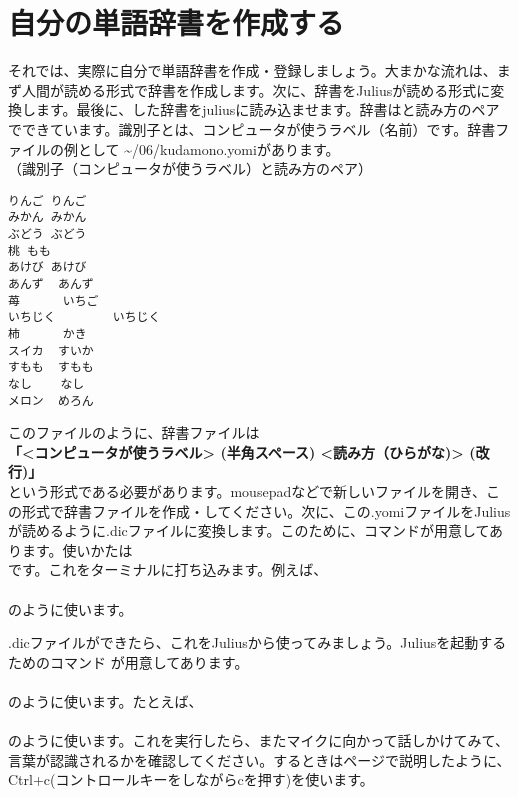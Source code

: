 \newpage
\section{自分の単語辞書を作成する}
それでは、実際に自分で単語辞書を作成・登録しましょう。大まかな流れは、まず人間が読める形式で辞書を作成します。次に、辞書をJuliusが読める形式に変換します。最後に、した辞書をjuliusに読み込ませます。辞書はと読み方のペアでできています。識別子とは、コンピュータが使うラベル（名前）です。辞書ファイルの例として \textasciitilde /06/kudamono.yomiがあります。\\

（識別子（コンピュータが使うラベル）と読み方のペア）


\begin{lstlisting}[caption=kudamino.yomi,label=kudamino.yomi]
りんご りんご
みかん みかん
ぶどう ぶどう
桃 もも
あけび あけび
あんず  あんず
苺      いちご
いちじく        いちじく
柿      かき
スイカ  すいか
すもも  すもも
なし    なし
メロン  めろん
\end{lstlisting}

このファイルのように、辞書ファイルは\\
\textbf{「<コンピュータが使うラベル> (半角スペース) <読み方（ひらがな)> (改行)」}\\
という形式である必要があります。mousepadなどで新しいファイルを開き、この形式で辞書ファイルを作成・してください。次に、この.yomiファイルをJuliusが読めるように.dicファイルに変換します。このために、コマンドが用意してあります。使いかたは\\
です。これをターミナルに打ち込みます。例えば、\\
\\
のように使います。

.dicファイルができたら、これをJuliusから使ってみましょう。Juliusを起動するためのコマンド  が用意してあります。\\
\\
のように使います。たとえば、\\
\\
のように使います。これを実行したら、またマイクに向かって話しかけてみて、言葉が認識されるかを確認してください。するときは\pageref{Julius}ページで説明したように、Ctrl+c(コントロールキーをしながらcを押す)を使います。


